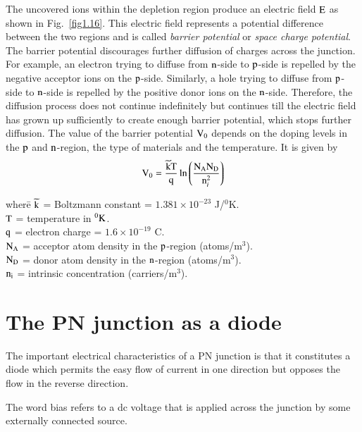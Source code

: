 The uncovered ions within the depletion region produce an electric field $\textrm{E}$ as shown in Fig.~\ref{fig1.16}. This electric field represents a potential difference between the two regions and is called {\em barrier potential} or {\em space charge potential}. The barrier potential discourages further diffusion of charges across the junction. For example, an electron trying to diffuse from $\textrm{n}$-side to $\textrm{p}$-side is repelled by the negative acceptor ions on the $\textrm{p}$-side. Similarly, a hole trying to diffuse from $\textrm{p}$-side to $\textrm{n}$-side is repelled by the positive donor ions on the $\textrm{n}$-side. Therefore, the diffusion process does not continue indefinitely but continues till the electric field has grown up sufficiently to create enough barrier potential, which stops further diffusion. The value of the barrier potential $\textrm{V}_{0}$ depends on the doping levels in the $\textrm{p}$ and $\textrm{n}$-region, the type of materials and the temperature. It is given by 
\begin{equation}
\textrm{V}_{0}=\frac{\widetilde{\textrm{k}}\textrm{T}}{\textrm{q}}\ln \left(\frac{\textrm{N}_{\textrm{A}}\textrm{N}_{\textrm{D}}}{\textrm{n}^{2}_{i}}\right)\label{eq1.3}
\end{equation}
\begin{tabbing}
where\quad \= $\widetilde{\textrm{k}}$ = Boltzmann constant = $1.381\times 10^{-23}$ J/$^{0}$K.\\[3pt]
      \> $\textrm{T}$ = temperature in $^{0}\textrm{K}$.\\[3pt]
      \> $\textrm{q}$ = electron charge = $1.6\times 10^{-19}$ C.\\[3pt]
      \> $\textrm{N}_{\textrm{A}}$ = acceptor atom density in the $\textrm{p}$-region (atoms/m$^{3}$).\\[3pt]
      \> $\textrm{N}_{\textrm{D}}$ = donor atom density in the $\textrm{n}$-region (atoms/m$^{3}$).\\[3pt]
      \> $\textrm{n}_{\textrm{i}}$ = intrinsic concentration (carriers/m$^{3}$).
\end{tabbing}

\section{The PN junction as a diode}\label{sec1.6}

The important electrical characteristics of a PN junction is that it constitutes a diode which permits the easy flow of current in one direction but opposes the flow in the reverse direction.

\smallskip
{} The word bias refers to a dc voltage that is applied across the junction by some externally connected source.

